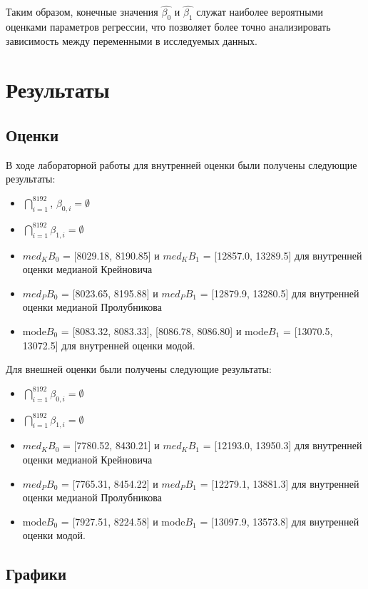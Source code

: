 \documentclass[a4paper, 12pt]{article}
\begin{document}
Таким образом, конечные значения $\widehat{\beta _0}$ и $\widehat{\beta _1}$ служат наиболее вероятными оценками параметров регрессии, что позволяет более точно анализировать зависимость между переменными в исследуемых данных.

\section{Результаты}
\subsection{Оценки}
В ходе лабораторной работы для внутренней оценки были получены следующие результаты:\\
\begin{itemize}
    \item $\bigcap_{i = 1}^{8192}$, $ \beta _{0, i} = \emptyset$
    \item $\bigcap_{i = 1}^{8192} \beta _{1, i} = \emptyset$
    \item $med_{K}{B_0}$ = [8029.18, 8190.85] и $med_{K}{B_1}$ = [12857.0, 13289.5] для внутренней оценки медианой Крейновича
    \item $med_{P}{B_0}$ = [8023.65, 8195.88] и $med_{P}{B_1}$ = [12879.9, 13280.5] для внутренней оценки медианой Пролубникова
    \item mode${B_0}$ = {[8083.32, 8083.33], [8086.78, 8086.80]} и mode${B_1}$ = [13070.5, 13072.5] для внутренней оценки модой.
\end{itemize}

Для внешней оценки были получены следующие результаты:\\
\begin{itemize}
    \item $\bigcap_{i = 1}^{8192} \beta _{0, i} = \emptyset$
    \item $\bigcap_{i = 1}^{8192} \beta _{1, i} = \emptyset$
    \item $med_{K}{B_0}$ = [7780.52, 8430.21] и $med_{K}{B_1}$ = [12193.0, 13950.3] для внутренней оценки медианой Крейновича
    \item $med_{P}{B_0}$ = [7765.31, 8454.22] и $med_{P}{B_1}$ = [12279.1, 13881.3] для внутренней оценки медианой Пролубникова
    \item mode${B_0}$ = [7927.51, 8224.58] и mode${B_1}$ = [13097.9, 13573.8] для внутренней оценки модой.
\end{itemize}

\subsection{Графики}
\end{document}
